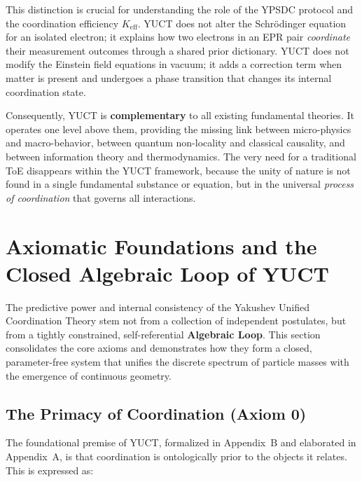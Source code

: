 \documentclass[11pt,a4paper]{article}
\begin{document}
This distinction is crucial for understanding the role of the YPSDC protocol and the coordination efficiency \(K_{\mathrm{eff}}\). YUCT does not alter the Schrödinger equation for an isolated electron; it explains how two electrons in an EPR pair \emph{coordinate} their measurement outcomes through a shared prior dictionary. YUCT does not modify the Einstein field equations in vacuum; it adds a correction term when matter is present and undergoes a phase transition that changes its internal coordination state.

Consequently, YUCT is \textbf{complementary} to all existing fundamental theories. It operates one level above them, providing the missing link between micro-physics and macro-behavior, between quantum non-locality and classical causality, and between information theory and thermodynamics. The very need for a traditional ToE disappears within the YUCT framework, because the unity of nature is not found in a single fundamental substance or equation, but in the universal \emph{process of coordination} that governs all interactions.


\section{Axiomatic Foundations and the Closed Algebraic Loop of YUCT}
\label{sec:axiomatic-foundations}

The predictive power and internal consistency of the Yakushev Unified Coordination Theory stem not from a collection of independent postulates, but from a tightly constrained, self-referential \textbf{Algebraic Loop}. This section consolidates the core axioms and demonstrates how they form a closed, parameter-free system that unifies the discrete spectrum of particle masses with the emergence of continuous geometry.

\subsection{The Primacy of Coordination (Axiom 0)}
\label{subsec:axiom0}

The foundational premise of YUCT, formalized in Appendix~B and elaborated in Appendix~A, is that coordination is ontologically prior to the objects it relates. This is expressed as:
\end{document}
